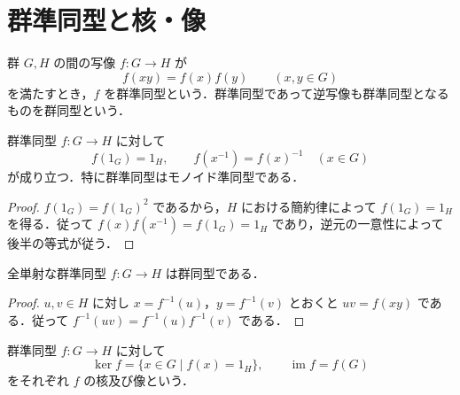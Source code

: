 \section{群準同型と核・像}
\begin{defn}[群準同型]
群 $G,H$ の間の写像 $f:G\to H$ が
\[
 f(xy)=f(x)f(y)\qquad(x,y\in G)
\]
を満たすとき，$f$ を群準同型という．群準同型であって逆写像も群準同型となるものを群同型という．
\end{defn}
\begin{prop}[単位元及び逆元の保存]
群準同型 $f:G\to H$ に対して
\[
 f(1_G)=1_H,\qquad f(x^{-1})=f(x)^{-1}\quad(x\in G)
\]
が成り立つ．特に群準同型はモノイド準同型である．
\end{prop}
\begin{proof}
$f(1_G)=f(1_G)^2$ であるから，$H$ における簡約律によって $f(1_G)=1_H$ を得る．従って $f(x)f(x^{-1})=f(1_G)=1_H$ であり，逆元の一意性によって後半の等式が従う．
\end{proof}
\begin{prop}[群同型の判定]
全単射な群準同型 $f:G\to H$ は群同型である．
\end{prop}
\begin{proof}
$u,v\in H$ に対し $x=f^{-1}(u)$，$y=f^{-1}(v)$ とおくと $uv=f(xy)$ である．従って $f^{-1}(uv)=f^{-1}(u)f^{-1}(v)$ である．
\end{proof}
\begin{defn}[核と像]
群準同型 $f:G\to H$ に対して
\[
 \ker f=\{x\in G\mid f(x)=1_H\},\qquad
 \operatorname{im} f=f(G)
\]
をそれぞれ $f$ の核及び像という．
\end{defn}
